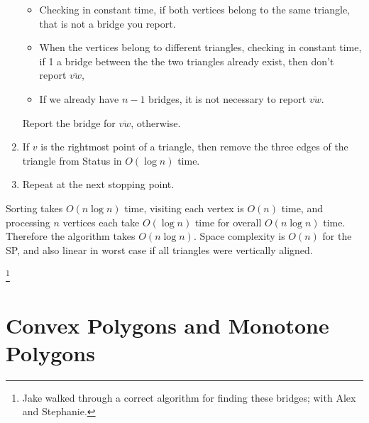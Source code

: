 \documentclass [12pt]{article}
\begin{document}
\begin{enumerate}
                \begin{itemize}
                    \item Checking in constant time, if both vertices belong to the same triangle, that is not a bridge you report. 
                    \item When the vertices belong to different triangles, checking in constant time, if 1 a bridge between the the two triangles already exist, then don't report $\overline{vw}$,
                    \item If we already have $n-1$ bridges, it is not necessary to report $\overline{vw}$.
                \end{itemize}
            
                Report the bridge for $\overline{vw}$, otherwise.
            
            
            
            \item If $v$ is the rightmost point of a triangle, then remove the three edges of the triangle from Status in $O(\log n)$ time.
            \item Repeat at the next stopping point. 
        \end{enumerate}

        Sorting takes $O(n\log n)$ time, visiting each vertex is $O(n)$ time, and processing $n$ vertices each take $O(\log n)$ time for overall $O(n\log n)$ time. Therefore the algorithm takes $O(n\log n)$. Space complexity is $O(n)$ for the SP, and also linear in worst case if all triangles were vertically aligned. 

    \footnote{Jake walked through a correct algorithm for finding these bridges; with Alex and Stephanie.}

        
    \pagebreak



    \section{Convex Polygons and Monotone Polygons}
    \label{sec:three}
\end{document}
